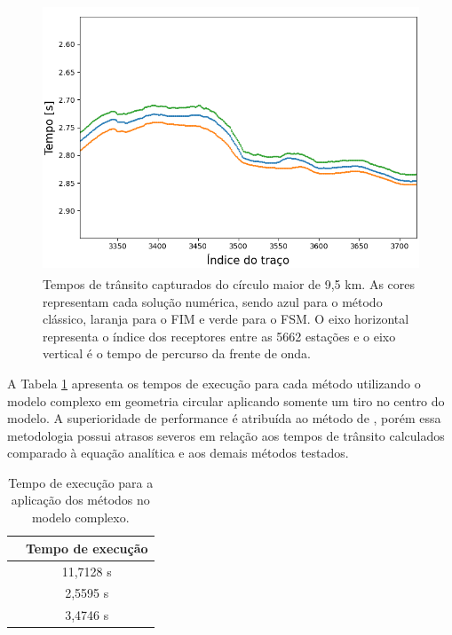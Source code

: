 \begin{figure}[H]
	\centering
	\includegraphics[height=8cm,width=13cm]{Imgs/Resultados/complex_w3.png} \newline 
	
	\caption{Tempos de trânsito capturados do círculo maior de 9,5 km. As cores representam cada solução numérica, sendo azul para o método clássico, laranja para o FIM e verde para o FSM. O eixo horizontal representa o índice dos receptores entre as 5662 estações e o eixo vertical é o tempo de percurso da frente de onda.}
	\label{fig:overthrust_outer_circle}
\end{figure}

A Tabela \ref{table_overthrust} apresenta os tempos de execução para cada método utilizando o modelo complexo em geometria circular aplicando somente um tiro no centro do modelo. A superioridade de performance é atribuída ao método de , porém essa metodologia possui atrasos severos em relação aos tempos de trânsito calculados comparado à equação analítica e aos demais métodos testados.

\begin{table}[H]
	\caption{Tempo de execução para a aplicação dos métodos no modelo complexo.}
	\begin{tabular}{r|c}
		& Tempo de execução \\ \hline
		\citeonline{podvin1991finite} & 11,7128 s  \\ \hline
		\citeonline{jeong2008fast} & 2,5595 s      \\ \hline
		\citeonline{noble2014accurate} & 3,4746 s         
	\end{tabular}
	\label{table_overthrust}
\end{table}

